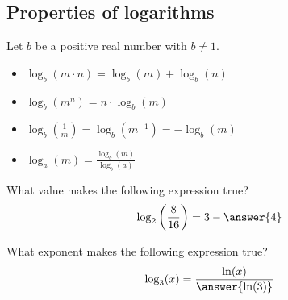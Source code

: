 \documentclass{ximera}
\begin{document}
\subsection{Properties of logarithms}
Let $b$ be a positive real number with $b\ne 1$.
\begin{itemize}
\item $\log_b(m\cdot n) = \log_b(m) + \log_b(n)$
\item $\log_b(m^n) = n\cdot \log_b(m)$
\item $\log_b\left(\frac{1}{m}\right) = \log_b(m^{-1}) = -\log_b(m)$
\item $\log_a(m) = \frac{\log_b(m)}{\log_b(a)}$
\end{itemize}

\begin{question}
  What value makes the following expression true?
  \[
  \log_2\left(\frac{8}{16}\right) = 3-\answer{4}
  \]
\end{question}


\begin{question}
  What exponent makes the following expression true?
  \[
  \log_3(x) = \frac{\ln(x)}{\answer{\ln(3)}}
  \]
\end{question}
\end{document}
